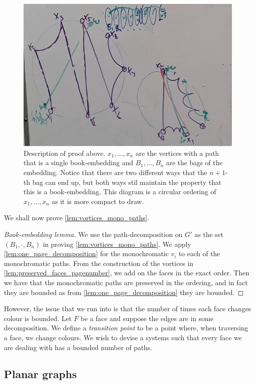 \begin{figure}
	\centering
	\includegraphics[width= 0.8 \textwidth]{chapters/figures/20240508_173516}
	\caption{Description of proof above. $x_1, ..., x_n$ are the vertices with a path that is a single book-embedding and $B_1, ..., B_n$ are the bags of the embedding. Notice that there are two different ways that the $n + 1$-th bag can end up, but both ways stil maintain the property that this is a book-embedding. This diagram is a circular ordering of $x_1, ..., x_n$ as it is more compact to draw.}
	\label{fig:}
\end{figure}


We shall now prove \cref{lem:vortices_mono_paths}.
\begin{proof}[Book-embedding lemma]
	We use the path-decomposition on $G'$ as the set $(B_1, \cdot , B_n)$ in proving \cref{lem:vortices_mono_paths}. We apply \cref{lem:one_page_decomposition} for the monochromatic $v_i$ to each of the monochromatic paths. From the construction of the vortices in \cref{lem:preserved_faces_pagenumber}, we add on the faces in the exact order. Then we have that the monochromatic paths are preserved in the ordering, and in fact they are bounded as from \cref{lem:one_page_decomposition} they are bounded.
\end{proof}

However, the issue that we run into is that the number of times each face changes colour is bounded. Let $F$ be a face and suppose the edges are in some decomposition. We define a \textit{transition point} to be a point where, when traversing a face, we change colours. We wish to devise a systems such that every face we are dealing with has a bounded number of paths.

\subsection{Planar graphs}

